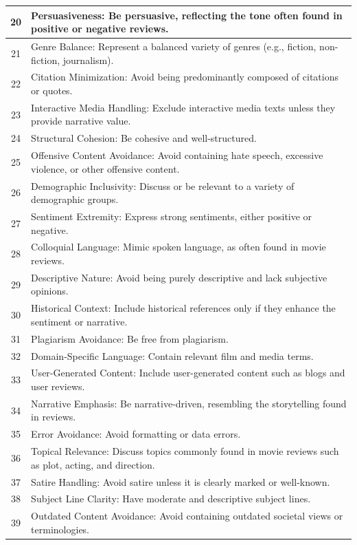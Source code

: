 \documentclass{article}
\begin{document}
\begin{longtable}{c|p{14cm}}
\hline
20 & Persuasiveness: Be persuasive, reflecting the tone often found in positive or negative reviews. \\
\hline
21 & Genre Balance: Represent a balanced variety of genres (e.g., fiction, non-fiction, journalism). \\
\hline
22 & Citation Minimization: Avoid being predominantly composed of citations or quotes. \\
\hline
23 & Interactive Media Handling: Exclude interactive media texts unless they provide narrative value. \\
\hline
24 & Structural Cohesion: Be cohesive and well-structured. \\
\hline
25 & Offensive Content Avoidance: Avoid containing hate speech, excessive violence, or other offensive content. \\
\hline
26 & Demographic Inclusivity: Discuss or be relevant to a variety of demographic groups. \\
\hline
27 & Sentiment Extremity: Express strong sentiments, either positive or negative. \\
\hline
28 & Colloquial Language: Mimic spoken language, as often found in movie reviews. \\
\hline
29 & Descriptive Nature: Avoid being purely descriptive and lack subjective opinions. \\
\hline
30 & Historical Context: Include historical references only if they enhance the sentiment or narrative. \\
\hline
31 & Plagiarism Avoidance: Be free from plagiarism. \\
\hline
32 & Domain-Specific Language: Contain relevant film and media terms. \\
\hline
33 & User-Generated Content: Include user-generated content such as blogs and user reviews. \\
\hline
34 & Narrative Emphasis: Be narrative-driven, resembling the storytelling found in reviews. \\
\hline
35 & Error Avoidance: Avoid formatting or data errors. \\
\hline
36 & Topical Relevance: Discuss topics commonly found in movie reviews such as plot, acting, and direction. \\
\hline
37 & Satire Handling: Avoid satire unless it is clearly marked or well-known. \\
\hline
38 & Subject Line Clarity: Have moderate and descriptive subject lines. \\
\hline
39 & Outdated Content Avoidance: Avoid containing outdated societal views or terminologies. \\

\end{longtable}
\end{document}

